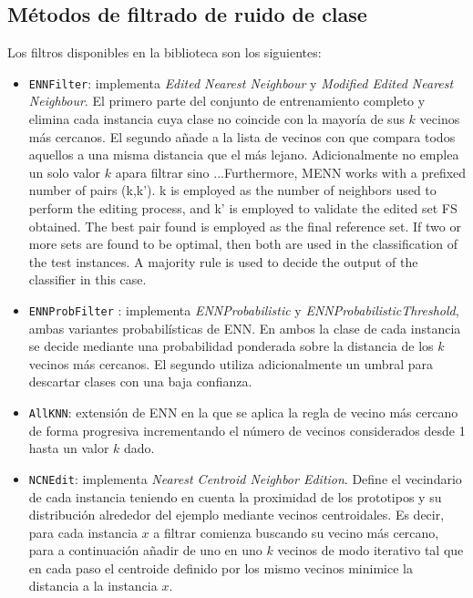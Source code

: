 \documentclass[print, color]{ugrTFG}
\begin{document}
 \subsection{Métodos de filtrado de ruido de clase}
 Los filtros disponibles en la biblioteca son los siguientes:
 \begin{itemize}
 
    \item \texttt{ENNFilter}: implementa \emph{Edited Nearest Neighbour} y \emph{Modified Edited Nearest Neighbour}. El primero parte del conjunto de entrenamiento completo y elimina cada instancia cuya clase no coincide con la mayoría de sus $k$ vecinos más cercanos. El segundo añade a la lista de vecinos con que compara todos aquellos a una misma distancia que el más lejano. Adicionalmente no emplea un solo valor $k$ apara filtrar sino ...Furthermore, MENN works with a prefixed number of pairs (k,k'). k is employed as the number of neighbors used to perform the editing process, and k' is employed to validate the edited set FS obtained. The best pair found is employed as the final reference set. If two or more sets are found to be optimal, then both are used in the classification of the test instances. A majority rule is used to decide the output of the classifier in this case.
    
    \item \texttt{ENNProbFilter} : implementa \emph{ENNProbabilistic} y \emph{ENNProbabilisticThreshold}, ambas variantes probabilísticas de ENN. En ambos la clase de cada instancia se decide mediante una probabilidad ponderada sobre la distancia de los $k$ vecinos más cercanos. El segundo utiliza adicionalmente un umbral para descartar clases con una baja confianza.
    
    \item \texttt{AllKNN}: extensión de ENN en la que se aplica la regla de vecino más cercano de forma progresiva incrementando el número de vecinos considerados desde 1 hasta un valor $k$ dado.
    
    \item \texttt{NCNEdit}: implementa \emph{Nearest Centroid Neighbor Edition}. Define el vecindario de cada instancia teniendo en cuenta la proximidad de los prototipos y su distribución alrededor del ejemplo mediante vecinos centroidales. Es decir, para cada instancia $x$ a filtrar comienza buscando su vecino más cercano, para a continuación añadir de uno en uno $k$ vecinos de modo iterativo tal que en cada paso el centroide definido por los mismo vecinos minimice la distancia a la instancia $x$. 
    

\end{itemize}
\end{document}
